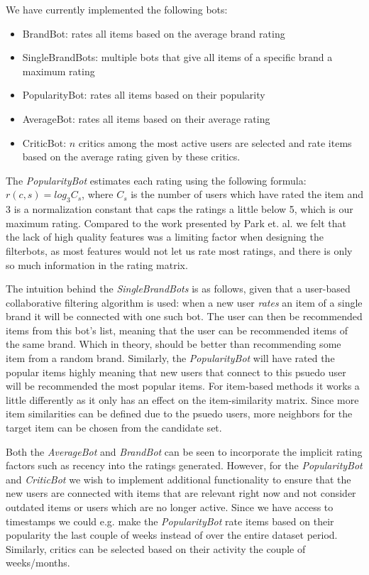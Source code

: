 We have currently implemented the following bots:

\begin{itemize}
\item BrandBot: rates all items based on the average brand rating
\item SingleBrandBots: multiple bots that give all items of a specific brand a maximum rating
\item PopularityBot: rates all items based on their popularity
\item AverageBot: rates all items based on their average rating
\item CriticBot: $n$ critics among the most active users are selected and rate items based on the average
	  rating given by these critics.
\end{itemize}

The \emph{PopularityBot} estimates each rating using the following formula: $r(c,s) = log_{3}C_{s}$, where $C_{s}$ is the number of users which have rated the item and $3$ is a normalization constant that caps the ratings a little below 5, which is our maximum rating.
Compared to the work presented by Park et. al. we felt that the lack of high quality features was a limiting factor when designing the filterbots, as most features would not let us rate most ratings, and there is only so much information in the rating matrix.

The intuition behind the \emph{SingleBrandBots} is as follows, given that a user-based collaborative filtering algorithm is used:
when a new user \emph{rates} an item of a single brand it will be connected with one such bot. The user can then be recommended
items from this bot's list, meaning that the user can be recommended items of the same brand. Which in theory, should be better
than recommending some item from a random brand. Similarly, the \emph{PopularityBot}
will have rated the popular items highly meaning that new users that connect to this psuedo user will be recommended the
most popular items. For item-based methods it works a little differently as it only has an effect on the item-similarity matrix.
Since more item similarities can be defined due to the psuedo users, more neighbors for the target item can be chosen from the candidate set.

Both the \emph{AverageBot} and \emph{BrandBot} can be seen to incorporate the implicit rating factors such as recency into
the ratings generated. However, for the \emph{PopularityBot} and \emph{CriticBot} we wish to implement additional functionality to ensure
that the new users are connected with items that are relevant right now and not consider outdated items or users which
are no longer active. Since we have access to timestamps we could e.g. make the \emph{PopularityBot} rate items based on
their popularity the last couple of weeks instead of over the entire dataset period. Similarly, critics can be selected
based on their activity the couple of weeks/months.

